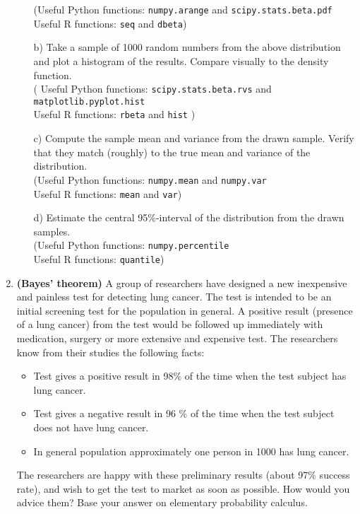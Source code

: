 \documentclass[11pt,a4paper,english]{article}
\begin{document}
\begin{enumerate}
\begin{itemize}
(Useful Python functions: {\tt numpy.arange} and {\tt scipy.stats.beta.pdf}
 \\Useful R functions: {\tt seq} and {\tt dbeta})

	\item[b)] Take a sample of 1000 random numbers from the above distribution and plot a histogram of the results. Compare visually to the density function.
	\\( Useful Python functions: {\tt scipy.stats.beta.rvs} and {\tt matplotlib.pyplot.hist}\\
	Useful R functions: {\tt rbeta} and {\tt hist} )
	\item[c)] Compute the sample mean and variance from the drawn sample. Verify that they match (roughly) to the true mean and variance of the distribution.\\
(Useful Python functions: {\tt numpy.mean} and {\tt numpy.var}\\
Useful R functions: {\tt mean} and {\tt var})
	\item[d)] Estimate the central 95\%-interval of the distribution from the drawn samples.\\
(Useful Python functions: {\tt numpy.percentile}\\ Useful R functions: {\tt quantile})
\end{itemize}



\item {\bf (Bayes' theorem)} A group of researchers have designed a new inexpensive and
  painless test for detecting lung cancer. The test is
  intended to be an initial screening test for the population in
  general. A positive result (presence of a lung cancer) from the test
  would be followed up immediately with medication, surgery or more
  extensive and expensive test. The researchers know from their
  studies the following facts:
  \begin{itemize}
  \item Test gives a positive result in 98$\%$  of the time when the
    test subject has lung cancer.
  \item Test gives a negative result in 96 $\%$ of the time when the
    test subject does not have lung cancer.
  \item In general population approximately one person in 1000 has
    lung cancer.
  \end{itemize}

  The researchers are happy with these preliminary results (about 97$\%$
  success rate), and wish to get the test to market as soon as
  possible. How would you advice them? Base your answer on elementary
  probability calculus.



\end{enumerate}
\end{document}
